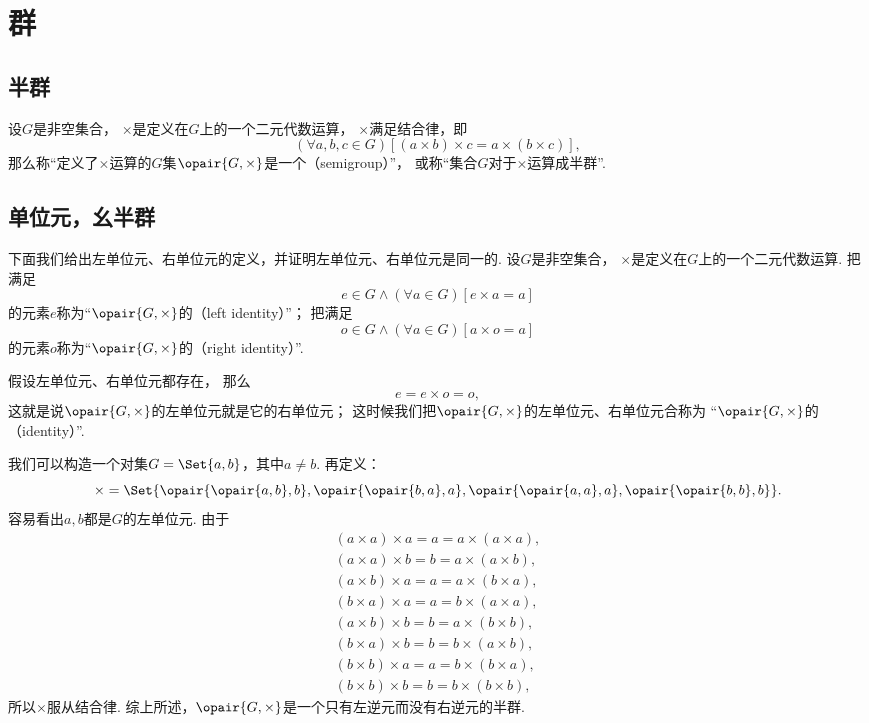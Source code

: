 \section{群}
\subsection{半群}
\begin{definition}\label{definition:抽象代数.半群的定义}
设\(G\)是非空集合，
\(\times\)是定义在\(G\)上的一个二元代数运算，
\(\times\)满足结合律，即\[
	(\forall a,b,c \in G)
	[(a \times b) \times c = a \times (b \times c)],
\]
那么称“定义了\(\times\)运算的\(G\)集\(\opair{G,\times}\)是一个（semigroup）”，
或称“集合\(G\)对于\(\times\)运算成半群”.
\end{definition}

\subsection{单位元，幺半群}
下面我们给出左单位元、右单位元的定义，并证明左单位元、右单位元是同一的.
设\(G\)是非空集合，
\(\times\)是定义在\(G\)上的一个二元代数运算.
把满足\[
	e \in G
	\land
	(\forall a \in G)[e \times a = a]
\]的元素\(e\)称为“\(\opair{G,\times}\)的（left identity）”；
把满足\[
	o \in G
	\land
	(\forall a \in G)[a \times o = a]
\]的元素\(o\)称为“\(\opair{G,\times}\)的（right identity）”.

假设左单位元、右单位元都存在，
那么\[
	e = e \times o = o,
\]
这就是说\(\opair{G,\times}\)的左单位元就是它的右单位元；
这时候我们把\(\opair{G,\times}\)的左单位元、右单位元合称为%
“\(\opair{G,\times}\)的（identity）”.

\begin{example}
我们可以构造一个对集\(G = \Set{ a, b }\)，其中\(a \neq b\).
再定义：\[
	\times = \Set{
		\opair{\opair{a,b},b},
		\opair{\opair{b,a},a},
		\opair{\opair{a,a},a},
		\opair{\opair{b,b},b}
	}.
\]
容易看出\(a,b\)都是\(G\)的左单位元.
由于\begin{align*}
	(a \times a) \times a = a = a \times (a \times a), \\
	(a \times a) \times b = b = a \times (a \times b), \\
	(a \times b) \times a = a = a \times (b \times a), \\
	(b \times a) \times a = a = b \times (a \times a), \\
	(a \times b) \times b = b = a \times (b \times b), \\
	(b \times a) \times b = b = b \times (a \times b), \\
	(b \times b) \times a = a = b \times (b \times a), \\
	(b \times b) \times b = b = b \times (b \times b),
\end{align*}
所以\(\times\)服从结合律.
综上所述，\(\opair{G,\times}\)是一个只有左逆元而没有右逆元的半群.
\end{example}

